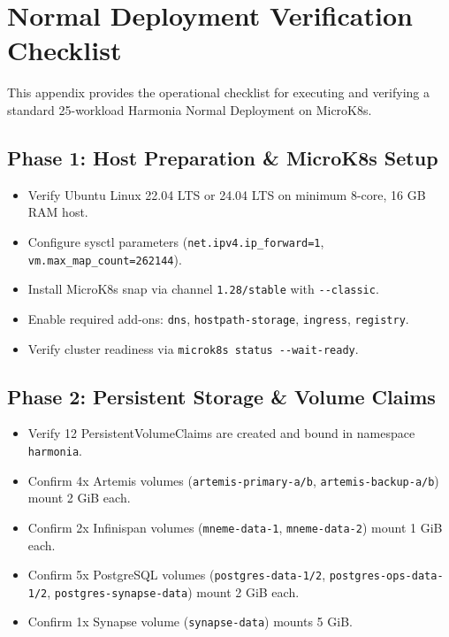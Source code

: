 
\chapter{Normal Deployment Verification Checklist}
\label{app:normal_checklist}

This appendix provides the operational checklist for executing and verifying a standard 25-workload Harmonia Normal Deployment on MicroK8s.

\section{Phase 1: Host Preparation \& MicroK8s Setup}
\begin{itemize}[label=$\square$]
    \item Verify Ubuntu Linux 22.04 LTS or 24.04 LTS on minimum 8-core, 16 GB RAM host.
    \item Configure sysctl parameters (\nolinkurl{net.ipv4.ip_forward=1}, \nolinkurl{vm.max_map_count=262144}).
    \item Install MicroK8s snap via channel \nolinkurl{1.28/stable} with \nolinkurl{--classic}.
    \item Enable required add-ons: \nolinkurl{dns}, \nolinkurl{hostpath-storage}, \nolinkurl{ingress}, \nolinkurl{registry}.
    \item Verify cluster readiness via \nolinkurl{microk8s status --wait-ready}.
\end{itemize}

\section{Phase 2: Persistent Storage \& Volume Claims}
\begin{itemize}[label=$\square$]
    \item Verify 12 PersistentVolumeClaims are created and bound in namespace \nolinkurl{harmonia}.
    \item Confirm 4x Artemis volumes (\nolinkurl{artemis-primary-a/b}, \nolinkurl{artemis-backup-a/b}) mount 2 GiB each.
    \item Confirm 2x Infinispan volumes (\nolinkurl{mneme-data-1}, \nolinkurl{mneme-data-2}) mount 1 GiB each.
    \item Confirm 5x PostgreSQL volumes (\nolinkurl{postgres-data-1/2}, \nolinkurl{postgres-ops-data-1/2}, \nolinkurl{postgres-synapse-data}) mount 2 GiB each.
    \item Confirm 1x Synapse volume (\nolinkurl{synapse-data}) mounts 5 GiB.
\end{itemize}

